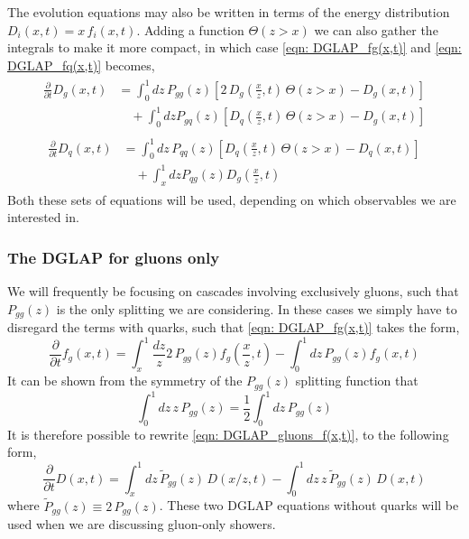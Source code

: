 \documentclass[main.tex]{subfiles}
\begin{document}
The evolution equations may also be written in terms of the energy distribution \(D_i(x,t) = x\, f_i(x,t)\). Adding a function \(\Theta(z>x)\) we can also gather the integrals to make it more compact, in which case \autoref{eqn: DGLAP_fg(x,t)} and \autoref{eqn: DGLAP_fq(x,t)} becomes, 
\begin{align}
\begin{split}
    \frac{\partial}{\partial t} D_g(x,t) &= \int_0^1 dz\,P_{gg}(z) \left[2\,D_g(\frac{x}{z},t)\, \Theta(z>x)-D_g(x,t)\right] \\
    &\quad + \int_0^1 dz P_{gq}(z) \left[ D_q(\frac{x}{z},t)\, \Theta(z>x) - D_g(x,t)\right]  
\end{split} \label{eqn: DGLAP_Dg(x,t)}
\end{align}
\begin{align}
    \begin{split}
    \frac{\partial}{\partial t} D_q(x,t) &= \int_0^1 dz\,P_{qq}(z) \left[D_q(\frac{x}{z},t)\, \Theta(z>x)-D_q(x,t)\right] \\
    &\quad + \int_x^1 dz P_{qg}(z) D_g(\frac{x}{z},t)
    \end{split} \label{eqn: DGLAP_Dq(x,t)}
\end{align}
Both these sets of equations will be used, depending on which observables we are interested in. 
\subsubsection*{The DGLAP for gluons only}
We will frequently be focusing on cascades involving exclusively gluons, such that \(P_{gg}(z)\) is the only splitting we are considering. In these cases we simply have to disregard the terms with quarks, such that \autoref{eqn: DGLAP_fg(x,t)} takes the form, 
\begin{equation}\label{eqn: DGLAP_gluons_f(x,t)}
    \frac{\partial}{\partial t} f_g(x,t) = \int_x^1 \frac{dz}{z} 2\,P_{gg}(z) f_g(\frac{x}{z},t) - \int_0^1 dz\, P_{gg}(z) f_g(x,t)
\end{equation}
It can be shown from the symmetry of the \(P_{gg}(z)\) splitting function that 
\begin{equation}\label{eqn: gg_Splitting_identitything}
    \int_0^1 dz \, z \, P_{gg}(z) = \frac{1}{2} \int_0^1 dz\, P_{gg}(z)
\end{equation}
It is therefore possible to rewrite \autoref{eqn: DGLAP_gluons_f(x,t)}, to the following form, 
\begin{equation}\label{eqn: DGLAP_energyflow}
    \frac{\partial}{\partial t} D(x,t) = \int_x^1 dz \,\tilde P_{gg}(z)\, D(x/z,t) - \int_0^1 dz\, z\, \tilde P_{gg}(z)\, D(x,t)
\end{equation}
where \(\tilde P_{gg}(z) \equiv 2\, P_{gg}(z) \). These two DGLAP equations without quarks will be used when we are discussing gluon-only showers.
\end{document}
